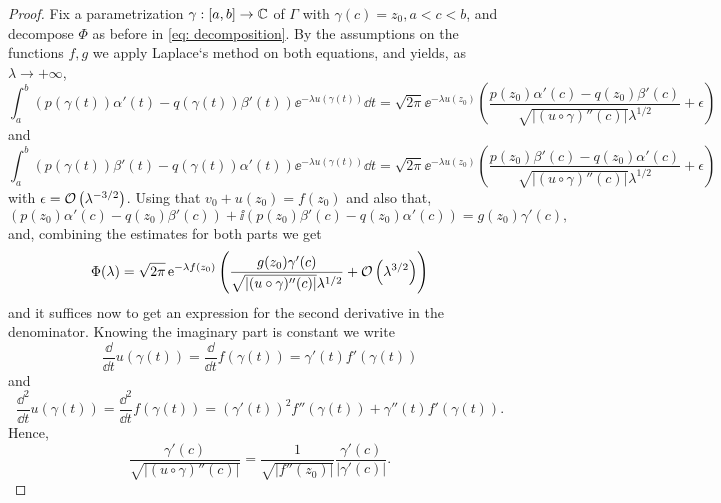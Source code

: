 \begin{proof}
	Fix a parametrization $\gamma : [a,b] \rightarrow \mathbb{C}$ of $\Gamma$ with $\gamma(c) = z_0, a < c < b$, and decompose $\Phi$ as before in \eqref{eq: decomposition}. By the assumptions on the functions $f, g$ we apply Laplace`s method on both equations, and yields, as $\lambda \rightarrow + \infty$,
	\begin{equation}
		\int_{a}^{b} (p(\gamma(t))\alpha'(t)-q(\gamma(t))\beta'(t)) \ee^{-\lambda u(\gamma(t))} \dd t = \sqrt{2\pi} \ee^{-\lambda u(z_0)} \left( \frac{p(z_0)\alpha'(c)-q(z_0)\beta'(c)}{\sqrt{|(u \circ \gamma)''(c)|} \lambda^{1/2}} + \epsilon \right)
	\end{equation}
	and
	\begin{equation}
		\int_{a}^{b} (p(\gamma(t))\beta'(t)-q(\gamma(t))\alpha'(t)) \ee^{-\lambda u(\gamma(t))} \dd t = \sqrt{2\pi} \ee^{-\lambda u(z_0)} \left( \frac{p(z_0)\beta'(c)-q(z_0)\alpha'(c)}{\sqrt{|(u \circ \gamma)''(c)|} \lambda^{1/2}} + \epsilon \right)
	\end{equation}
	with $ \epsilon = \mathcal{O} \left(\lambda^{-3/2}\right)$. Using that $v_0 + u(z_0) = f(z_0)$ and also that,
	\begin{equation}
		 (p(z_0)\alpha'(c)-q(z_0)\beta'(c)) + \ii (p(z_0)\beta'(c)-q(z_0)\alpha'(c)) = g(z_0)\gamma'(c),
	\end{equation}
	and, combining the estimates for both parts we get
	\begin{equation}
		\Phi(\lambda) = \sqrt{2\pi} \operatorname{e}^{-\lambda f(z_0)} \left( \frac{g(z_0)\gamma'(c)}{\sqrt{|(u \circ \gamma)''(c)|} \lambda^{1/2}} + \mathcal{O} \left(\lambda^{3/2}\right) \right)
	\end{equation} 
	and it suffices now to get an expression for the second derivative in the denominator. Knowing the imaginary part is constant we write
	\begin{equation}
		\frac{\dd}{\dd t} u(\gamma(t)) = \frac{\dd}{\dd t} f(\gamma(t)) = \gamma'(t) f'(\gamma(t))
	\end{equation}
	and
	\begin{equation}
		\frac{\dd^2}{\dd t} u(\gamma(t)) = \frac{\dd^2}{\dd t} f(\gamma(t)) = (\gamma'(t))^2 f''(\gamma(t)) + \gamma''(t) f'(\gamma(t)).
	\end{equation}
	Hence,
	\begin{equation}
		\frac{\gamma'(c)}{\sqrt{|(u \circ \gamma)''(c)|}} = \frac{1}{\sqrt{|f''(z_0)|}} \frac{\gamma'(c)}{|\gamma'(c)|}.
	\end{equation}
\end{proof}

